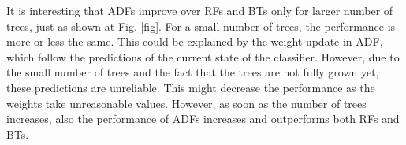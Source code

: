 \documentclass[10pt,twocolumn,letterpaper]{article}
\begin{document}
It is interesting that ADFs improve over RFs and BTs only for larger number of trees, just as shown at Fig. \ref{fig}. For a small number of trees, the performance is more or less the same. This could be explained by the weight update in ADF, which follow the predictions of the current state of the classifier. However, due to the small number of trees and the fact that the trees are not fully grown yet, these predictions are unreliable. This might decrease the performance as the weights take unreasonable values. However, as soon as the number of trees increases, also the performance of ADFs increases and outperforms both RFs and BTs.

{\small


}
\end{document}
